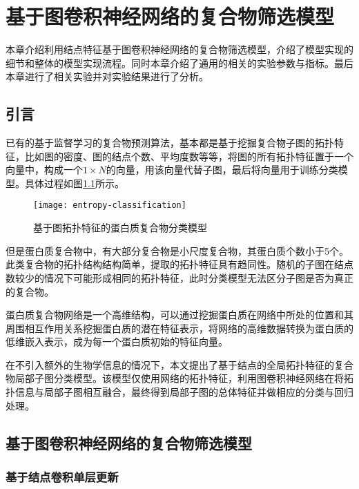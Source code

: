 \chapter{基于图卷积神经网络的复合物筛选模型}
\label{chapter:NodeConv}

本章介绍利用结点特征基于图卷积神经网络的复合物筛选模型，介绍了模型实现的细节和整体的模型实现流程。同时本章介绍了通用的相关的实验参数与指标。最后本章进行了相关实验并对实验结果进行了分析。

\section{引言}
\label{section:NodeConv:Put}

已有的基于监督学习的复合物预测算法，基本都是基于挖掘复合物子图的拓扑特征，比如图的密度、图的结点个数、平均度数等等，将图的所有拓扑特征置于一个向量中，构成一个$1\times N$的向量，用该向量代替子图，最后将向量用于训练分类模型。具体过程如图\ref{fig:entropy-classification}所示。

\begin{figure}[htbp]
    \centering
    \texttt{[image: entropy-classification]}
    \caption{基于图拓扑特征的蛋白质复合物分类模型}
    \label{fig:entropy-classification}
\end{figure}


但是蛋白质复合物中，有大部分复合物是小尺度复合物，其蛋白质个数小于5个。此类复合物的拓扑结构结构简单，提取的拓扑特征具有趋同性。随机的子图在结点数较少的情况下可能形成相同的拓扑特征，此时分类模型无法区分子图是否为真正的复合物。

蛋白质复合物网络是一个高维结构，可以通过挖掘蛋白质在网络中所处的位置和其周围相互作用关系挖掘蛋白质的潜在特征表示，将网络的高维数据转换为蛋白质的低维嵌入表示，成为每一个蛋白质初始的特征向量。

在不引入额外的生物学信息的情况下，本文提出了基于结点的全局拓扑特征的复合物局部子图分类模型。该模型仅使用网络的拓扑特征，利用图卷积神经网络在将拓扑信息与局部子图相互融合，最终得到局部子图的总体特征并做相应的分类与回归处理。

\section{基于图卷积神经网络的复合物筛选模型}
\label{section:NodeConv:detail}

\subsection{基于结点卷积单层更新}

